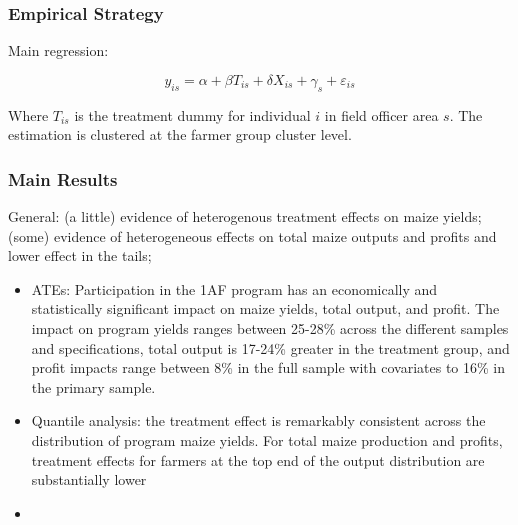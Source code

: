 \documentclass[12pt,letterpaper]{article}
\begin{document}
\subsubsection*{Empirical Strategy}

\noindent Main regression:

\begin{equation}
y_{is} = \alpha+ \beta T_{is} +\delta X_{is} +\gamma_s + \varepsilon_{is} 
\end{equation}

\noindent Where $T_{is}$ is the treatment dummy for individual $i$ in field officer area $s$. The estimation is clustered at the farmer group cluster level.
  

\subsubsection*{Main Results}

\noindent General: (a little) evidence of heterogenous treatment effects on maize yields; (some) evidence of heterogeneous effects on total maize outputs and profits and lower effect in the tails; 
\begin{itemize}
  \item  ATEs: Participation in the 1AF program has an economically and statistically significant impact on maize yields, total output, and profit. The impact on program yields ranges between 25-28\% across the different samples and specifications, total output is 17-24\% greater in the treatment group, and profit impacts range between 8\% in the full sample with covariates to 16\% in the primary sample. 
  \item Quantile analysis: the treatment effect is remarkably consistent across the distribution of program maize yields. For total maize production and profits, treatment effects for farmers at the top end of the output distribution are substantially lower
  \item  
\end{itemize}




\end{document}
